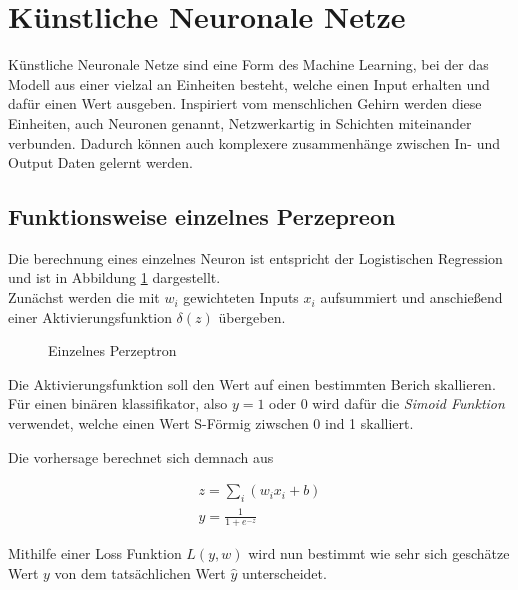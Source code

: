 
\section{Künstliche Neuronale Netze} \label{sec:nn}


Künstliche Neuronale Netze sind eine Form des Machine Learning, 
bei der das Modell aus einer vielzal an Einheiten besteht, welche 
einen Input erhalten und dafür einen Wert ausgeben. Inspiriert 
vom menschlichen Gehirn werden diese Einheiten, auch Neuronen genannt, 
Netzwerkartig in Schichten miteinander verbunden. Dadurch können 
auch komplexere zusammenhänge zwischen In- und Output Daten 
gelernt werden.



\subsection{Funktionsweise einzelnes Perzepreon}\label{subsec:percepron}

Die berechnung eines einzelnes Neuron ist entspricht der Logistischen 
Regression und ist in Abbildung \ref{fig:neuron} dargestellt.
\\
Zunächst werden die mit $w_{i}$ gewichteten Inputs $x_{i}$ aufsummiert 
und anschießend einer Aktivierungsfunktion $\delta(z)$ übergeben.

\begin{figure}[htb]
    \centering
    
    \caption{Einzelnes Perzeptron}
    \label{fig:neuron}
\end{figure}

Die Aktivierungsfunktion soll den Wert auf einen bestimmten Berich skallieren.
Für einen binären klassifikator, also $y = 1$ oder $0$ wird dafür die 
\textit{Simoid Funktion} verwendet, welche einen Wert S-Förmig ziwschen 0 ind 1 
skalliert. 

Die vorhersage berechnet sich demnach aus 

\begin{align}
    \label{eq:neuron}
    z = \sum_{i}(w_{i}x_{i} + b)\\
    y = \frac{1}{1 + e^{-z}}
\end{align}

Mithilfe einer Loss Funktion $L(y,w)$ wird nun bestimmt wie sehr sich geschätze 
Wert $y$ von dem tatsächlichen Wert $\hat{y}$ unterscheidet.

